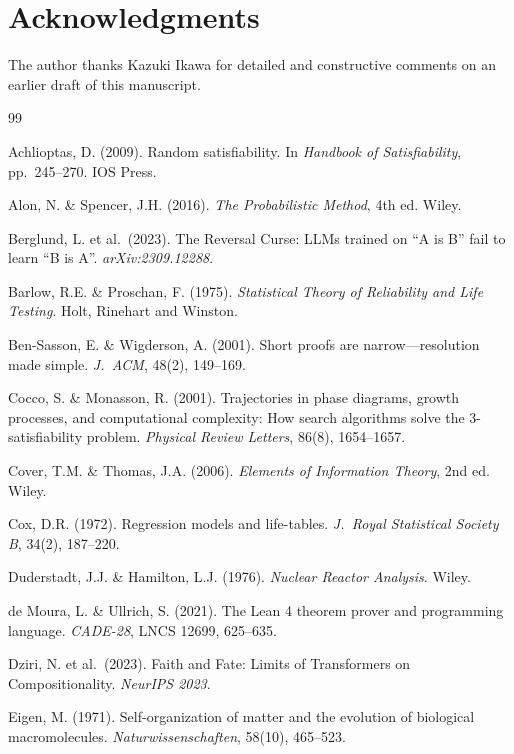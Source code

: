 \documentclass[11pt,a4paper]{article}
\begin{document}
\section*{Acknowledgments}
The author thanks Kazuki Ikawa for detailed and constructive comments on an earlier draft of this manuscript.

\begin{thebibliography}{99}

Achlioptas, D. (2009).
Random satisfiability.
In \emph{Handbook of Satisfiability}, pp.~245--270. IOS Press.

Alon, N. \& Spencer, J.H. (2016).
\emph{The Probabilistic Method}, 4th ed.
Wiley.

Berglund, L. et al.\ (2023).
The Reversal Curse: LLMs trained on ``A is B'' fail to learn ``B is A''.
\emph{arXiv:2309.12288}.

Barlow, R.E. \& Proschan, F. (1975).
\emph{Statistical Theory of Reliability and Life Testing}.
Holt, Rinehart and Winston.

Ben-Sasson, E. \& Wigderson, A. (2001).
Short proofs are narrow---resolution made simple.
\emph{J.\ ACM}, 48(2), 149--169.

Cocco, S. \& Monasson, R. (2001).
Trajectories in phase diagrams, growth processes, and computational complexity: How search algorithms solve the 3-satisfiability problem.
\emph{Physical Review Letters}, 86(8), 1654--1657.

Cover, T.M. \& Thomas, J.A. (2006).
\emph{Elements of Information Theory}, 2nd ed.
Wiley.

Cox, D.R. (1972).
Regression models and life-tables.
\emph{J.\ Royal Statistical Society B}, 34(2), 187--220.

Duderstadt, J.J. \& Hamilton, L.J. (1976).
\emph{Nuclear Reactor Analysis}.
Wiley.

de Moura, L. \& Ullrich, S. (2021).
The Lean 4 theorem prover and programming language.
\emph{CADE-28}, LNCS 12699, 625--635.

Dziri, N. et al.\ (2023).
Faith and Fate: Limits of Transformers on Compositionality.
\emph{NeurIPS 2023}.

Eigen, M. (1971).
Self-organization of matter and the evolution of biological macromolecules.
\emph{Naturwissenschaften}, 58(10), 465--523.


\end{thebibliography}
\end{document}
